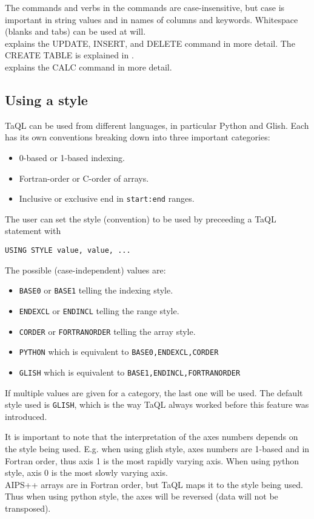 The commands and verbs in the commands are
case-insensitive, but case is important in string values and
in names of columns and keywords. Whitespace (blanks and tabs) can
be used at will.
\\ explains the
UPDATE, INSERT, and DELETE command in more detail. The CREATE TABLE is
explained in .
\\
explains the CALC command in more detail.

\subsection{Using a style}
TaQL can be used from different languages, in particular Python and
Glish. Each has its own conventions breaking down into three important
categories: 
\begin{itemize}
\item 0-based or 1-based indexing.
\item Fortran-order or C-order of arrays.
\item Inclusive or exclusive end in \texttt{start:end} ranges.
\end{itemize}
The user can set the style (convention) to be used by preceeding a
TaQL statement with
\begin{verbatim}
USING STYLE value, value, ...
\end{verbatim}
The possible (case-independent) values are:
\begin{itemize}
\item \texttt{BASE0} or \texttt{BASE1} telling the indexing style.
\item \texttt{ENDEXCL} or \texttt{ENDINCL} telling the range style.
\item \texttt{CORDER} or \texttt{FORTRANORDER} telling the array style.
\item \texttt{PYTHON} which is equivalent to \texttt{BASE0,ENDEXCL,CORDER}
\item \texttt{GLISH} which is equivalent to \texttt{BASE1,ENDINCL,FORTRANORDER}
\end{itemize}
If multiple values are given for a category, the last one will be used.
The default style used is \texttt{GLISH}, which is the way TaQL always
worked before this feature was introduced.

It is important to note that the interpretation of the axes numbers
depends on the style being used. E.g. when using glish style, axes numbers are
1-based and in Fortran order, thus axis 1 is the most rapidly varying
axis. When using python style, axis 0 is the most slowly varying axis.
\\AIPS++ arrays are in Fortran order, but TaQL maps it to the
style being used. Thus when using python style, the axes will be
reversed (data will not be transposed).

